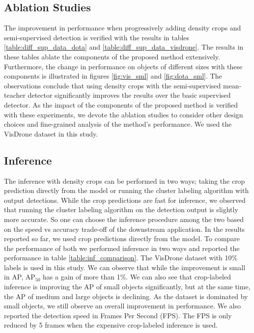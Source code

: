 \subsection{Ablation Studies}
The improvement in performance when progressively adding density crops and semi-supervised detection is verified with the results in tables \ref{table:diff_sup_data_dota} and \ref{table:diff_sup_data_visdrone}. The results in these tables ablate the components of the proposed method extensively. Furthermore, the change in performance on objects of different sizes with these components is illustrated in figures \ref{fig:vis_sml} and \ref{fig:dota_sml}. The observations conclude that using density crops with the semi-supervised mean-teacher detector significantly improves the results over the basic supervised detector. As the impact of the components of the proposed method is verified with these experiments, we devote the ablation studies to consider other design choices and fine-grained analysis of the method's performance. We used the VisDrone dataset in this study.

\subsection{Inference}
The inference with density crops can be performed in two ways; taking the crop prediction directly from the model or running the cluster labeling algorithm with output detections. While the crop predictions are fast for inference, we observed that running the cluster labeling algorithm on the detection output is slightly more accurate. So one can choose the inference procedure among the two based on the speed vs accuracy trade-off of the downstream application. In the results reported so far, we used crop predictions directly from the model. To compare the performance of both we performed inference in two ways and reported the performance in table \ref{table:inf_comparison}. The VisDrone dataset with 10\% labels is used in this study. We can observe that while the improvement is small in AP, $\textrm{AP}_{50}$ has a gain of more than 1\%. We can also see that crop-labeled inference is improving the AP of small objects significantly, but at the same time, the AP of medium and large objects is declining. As the dataset is dominated by small objects, we still observe an overall improvement in performance. We also reported the detection speed in Frames Per Second (FPS). The FPS is only reduced by 5 frames when the expensive crop-labeled inference is used.


